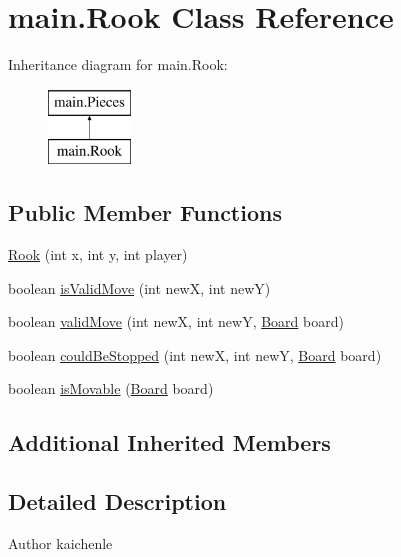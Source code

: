 \hypertarget{classmain_1_1_rook}{}\section{main.\+Rook Class Reference}
\label{classmain_1_1_rook}
Inheritance diagram for main.\+Rook\+:\begin{figure}[H]
\begin{center}
\leavevmode
\includegraphics[height=2.000000cm]{classmain_1_1_rook}
\end{center}
\end{figure}
\subsection*{Public Member Functions}
\begin{DoxyCompactItemize}
\item 
\mbox{\hyperlink{classmain_1_1_rook_a6b0bbb8687463b828687c62b858cc479}{Rook}} (int x, int y, int player)
\item 
boolean \mbox{\hyperlink{classmain_1_1_rook_a83d5128f2957334e011560ae9d2f5f92}{is\+Valid\+Move}} (int newX, int newY)
\item 
boolean \mbox{\hyperlink{classmain_1_1_rook_a2b4fa722d895acc10aeae86c50d1a911}{valid\+Move}} (int newX, int newY, \mbox{\hyperlink{classmain_1_1_board}{Board}} board)
\item 
boolean \mbox{\hyperlink{classmain_1_1_rook_ad78bc0a0dc96db23b2476b897722371c}{could\+Be\+Stopped}} (int newX, int newY, \mbox{\hyperlink{classmain_1_1_board}{Board}} board)
\item 
boolean \mbox{\hyperlink{classmain_1_1_rook_ac94718e4402dc3f01761ec2503fb1c13}{is\+Movable}} (\mbox{\hyperlink{classmain_1_1_board}{Board}} board)
\end{DoxyCompactItemize}
\subsection*{Additional Inherited Members}


\subsection{Detailed Description}
\begin{DoxyAuthor}{Author}
kaichenle 
\end{DoxyAuthor}


